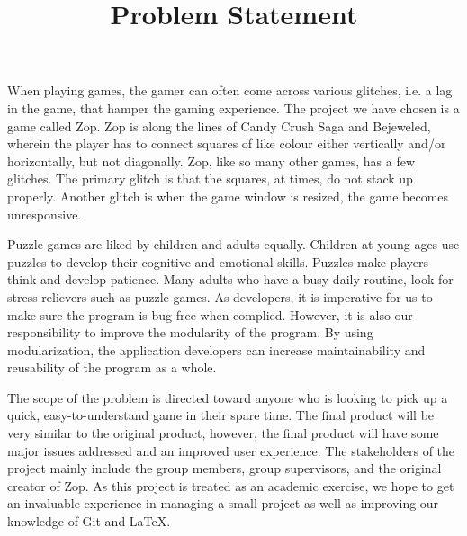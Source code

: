 \documentclass[12pt]{article}
\begin{document}
\title{Problem Statement}
\maketitle

When playing games, the gamer can often come across various glitches, i.e. a lag in the game, that hamper the gaming experience. The project we have chosen is a game called Zop. Zop is along the lines of Candy Crush Saga and Bejeweled, wherein the player has to connect squares of like colour either vertically and/or horizontally, but not diagonally. Zop, like so many other games, has a few glitches. The primary glitch is that the squares, at times, do not stack up properly. Another glitch is when the game window is resized, the game becomes unresponsive. 

Puzzle games are liked by children and adults equally. Children at young ages use puzzles to develop their cognitive and emotional skills. Puzzles make players think and develop patience. Many adults who have a busy daily routine, look for stress relievers such as puzzle games. As developers, it is imperative for us to make sure the program is bug-free when complied. However, it is also our responsibility to improve the modularity of the program. By using modularization, the application developers can increase maintainability and reusability of the program as a whole.

The scope of the problem is directed toward anyone who is looking to pick up a quick, easy-to-understand game in their spare time. The final product will be very similar to the original product, however, the final product will have some major issues addressed and an improved user experience. 
The stakeholders of the project mainly include the group members, group supervisors, and the original creator of Zop.
As this project is treated as an academic exercise, we hope to get an invaluable experience in managing a small project as well as improving our knowledge of Git and LaTeX.
\end{document}
